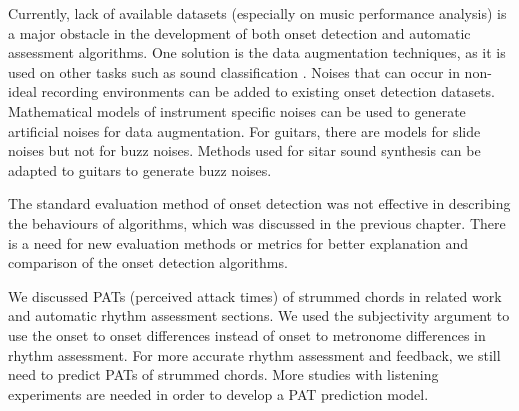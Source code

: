 Currently, lack of available datasets (especially on music performance analysis) is a major obstacle in the development of both onset detection and automatic assessment algorithms. One solution is the data augmentation techniques, as it is used on other tasks such as sound classification \cite{salamon2017deep}. Noises that can occur in non-ideal recording environments can be added to existing onset detection datasets. Mathematical models of instrument specific noises can be used to generate artificial noises for data augmentation. For guitars, there are models for slide noises \cite{pakarinen2007analysis} but not for buzz noises. Methods used for sitar sound synthesis \cite{vyasarayani2009} can be adapted to guitars to generate buzz noises. 

The standard evaluation method of onset detection was not effective in describing the behaviours of algorithms, which was discussed in the previous chapter. There is a need for new evaluation methods or metrics for better explanation and comparison of the onset detection algorithms.

We discussed PATs (perceived attack times) of strummed chords in related work and automatic rhythm assessment sections. We used the subjectivity argument to use the onset to onset differences instead of onset to metronome differences in rhythm assessment. For more accurate rhythm assessment and feedback, we still need to predict PATs of strummed chords. More studies with listening experiments are needed in order to develop a PAT prediction model. 

\newpage
